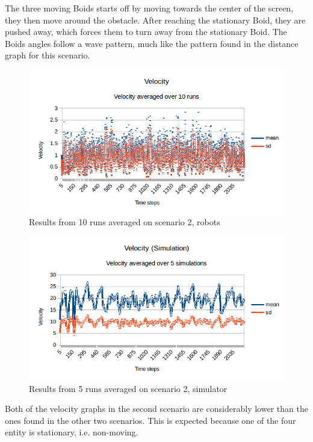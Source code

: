 The three moving Boids starts off by moving towards the center of the screen, they then move around the obstacle. After reaching the stationary Boid, they are pushed away, which forces them to turn away from the stationary Boid. The Boids angles follow a wave pattern, much like the pattern found in the distance graph for this scenario.

\begin{figure}[h]
\begin{center}
\includegraphics[width=0.8\linewidth]{figs/runs/2pvel}
\end{center}
\caption[2. Velocity, robots]{Results from 10 runs averaged on scenario 2, robots}
\label{fig:res2pvel}
\end{figure}
\begin{figure}[h]
\begin{center}
\includegraphics[width=0.8\linewidth]{figs/runs/2svel}
\end{center}
\caption[2. Velocity, robots]{Results from 5 runs averaged on scenario 2, simulator}
\label{fig:res2svel}
\end{figure}
Both of the velocity graphs in the second scenario are considerably lower than the ones found in the other two scenarios. This is expected because one of the four entity is stationary, i.e. non-moving. 
\clearpage
